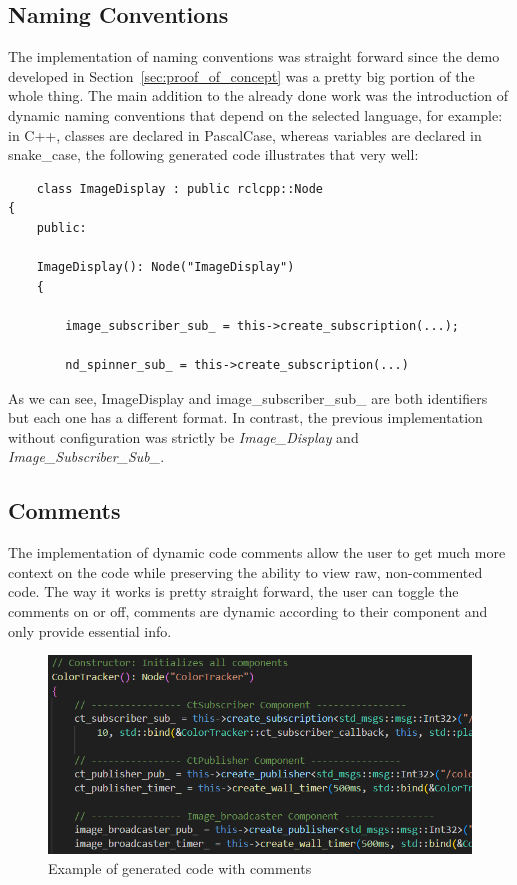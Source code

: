 \subsection{Naming Conventions}
\label{sec:impl_name_conv}

The implementation of naming conventions was straight forward since the demo developed in Section~\ref{sec:proof_of_concept} was a pretty big portion of the whole thing. The main addition to the already done work was the introduction of dynamic naming conventions that depend on the selected language, for example: in C++, classes are declared in PascalCase, whereas variables are declared in snake\_case, the following generated code illustrates that very well:

\begin{verbatim}
	class ImageDisplay : public rclcpp::Node
{
	public:
	
	ImageDisplay(): Node("ImageDisplay")
	{
		
		image_subscriber_sub_ = this->create_subscription(...);
		
		nd_spinner_sub_ = this->create_subscription(...)
\end{verbatim}

As we can see, ImageDisplay and image\_subscriber\_sub\_ are both identifiers but each one has a different format. In contrast, the previous implementation without configuration was strictly be \textit{Image\_Display} and \textit{Image\_Subscriber\_Sub\_}.


\subsection{Comments}
\label{sec:impl_comments}

The implementation of dynamic code comments allow the user to get much more context on the code while preserving the ability to view raw, non-commented code. The way it works is pretty straight forward, the user can toggle the comments on or off, comments are dynamic according to their component and only provide essential info.

\begin{figure}[htbp]
	\centering
	\includegraphics[width=\textwidth]{comments.png}
	\caption{Example of generated code with comments}
	\label{fig:comment}
\end{figure}

